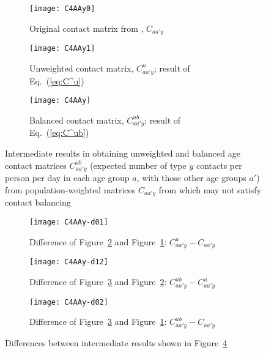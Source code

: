 \begin{figure}
  \setlength{\abovecaptionskip}{.5\smallskipamount}
  \setlength{\belowcaptionskip}{.5\smallskipamount}
  \begin{subfigure}{\linewidth}
    \texttt{[image: C4AAy0]}
    \caption{Original contact matrix from \cite{Prem2021}, $C_{aa'y}$}
    \label{fig:C4AAy0}
  \end{subfigure}
  \begin{subfigure}{\linewidth}
    \texttt{[image: C4AAy1]}
    \caption{Unweighted contact matrix, $C^u_{aa'y}$; result of Eq.~(\ref{eq:C^u})}
    \label{fig:C4AAy1}
  \end{subfigure}
  \begin{subfigure}{\linewidth}
    \texttt{[image: C4AAy]}
    \caption{Balanced contact matrix, $C^{ub}_{aa'y}$; result of Eq.~(\ref{eq:C^ub})}
    \label{fig:C4AAy2}
  \end{subfigure}
  \caption{Intermediate results in obtaining unweighted and balanced age contact matrices $C^{ub}_{aa'y}$
    (expected number of type $y$ contacts per person per day in each age group $a$, with those other age groups $a'$)
    from population-weighted matrices $C_{aa'y}$ from \cite{Prem2021} which may not satisfy contact balancing}
  \label{fig:C4AAyi}
\end{figure}
\begin{figure}
  \begin{subfigure}{\linewidth}
    \texttt{[image: C4AAy-d01]}
    \caption{Difference of Figure~\ref{fig:C4AAy1} and Figure~\ref{fig:C4AAy0}: $C^{u}_{aa'y} - C_{aa'y}$}
    \label{fig:C4AAyd01}
  \end{subfigure}
  \begin{subfigure}{\linewidth}
    \texttt{[image: C4AAy-d12]}
    \caption{Difference of Figure~\ref{fig:C4AAy2} and Figure~\ref{fig:C4AAy1}: $C^{ub}_{aa'y} - C^{u}_{aa'y}$}
    \label{fig:C4AAyd12}
  \end{subfigure}
  \begin{subfigure}{\linewidth}
    \texttt{[image: C4AAy-d02]}
    \caption{Difference of Figure~\ref{fig:C4AAy2} and Figure~\ref{fig:C4AAy0}: $C^{ub}_{aa'y} - C_{aa'y}$}
    \label{fig:C4AAyd02}
  \end{subfigure}
  \caption{Differences between intermediate results shown in Figure~\ref{fig:C4AAyi}}
  \label{fig:C4AAyd}
\end{figure}
